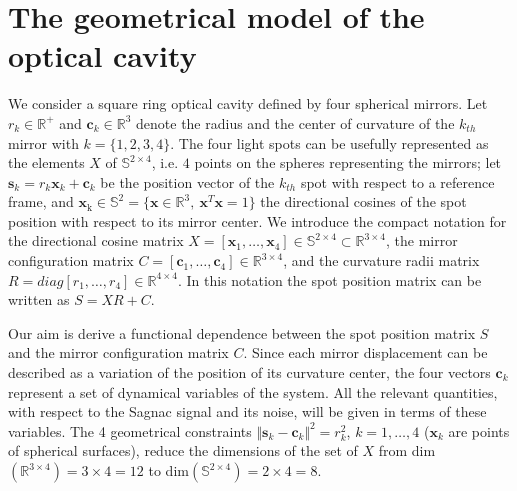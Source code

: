 \documentclass[12pt,a4paper,final]{iopart}
\begin{document}
\section{The geometrical model of the optical cavity}
We consider a square ring optical cavity defined by four spherical mirrors. 
Let $r_{k}\in\mathbb{R}^{+}$
and $\mathbf{c}_{k}\in\mathbb{R}^{3}$ denote the radius and the center
of curvature of the $k_{th}$ mirror with $k=\{ 1,2,3,4\} $.
The four light spots can be usefully represented as the elements $X$
of $\mathbb{S}^{2 \times 4}$, i.e. $4$ points on the spheres representing
the mirrors; let $\mathbf{s}_{k}=r{}_{k}\mathbf{x}_{k}+\mathbf{c}_{k}$
be the position vector of the $k_{th}$ spot with respect to a reference
frame, and $\mathbf{\mathbf{x}_{\mathrm{k}}}\in\mathbb{S}^{2}$$=\{ \mathbf{x}\in\mathbb{R}^{3},\ \mathbf{x}^{T}\mathbf{x}=1\} $
the directional cosines of the spot position with respect to its mirror
center. We introduce the compact notation for the directional cosine matrix
$X=[\mathbf{x}_{1},\ldots,\mathbf{x}_{4}]\in\mathbb{S}^{2 \times 4}\subset\mathbb{R}^{3\times4}$,
the mirror configuration matrix $C=[\mathbf{c}_{1},\ldots,\mathbf{c}_{4}]\in\mathbb{R}^{3\times4}$,
and the curvature radii matrix $R=diag[r_{1},\dots,r_{4}]\in\mathbb{R}^{4\times4}$.
In this notation the spot position matrix can be written as $S=XR+C$.

Our aim is derive a functional dependence between the spot position matrix $S$ and the mirror configuration matrix $C$. Since each mirror displacement 
can be described as a variation of the position of its curvature center,
the four vectors $\mathbf{c}_{k}$ represent a set of dynamical
variables of the system. All the relevant quantities, with respect to the Sagnac signal and its noise, will be given in terms of these variables.
The 4 geometrical constraints $\Vert \mathbf{s}_{k}-\mathbf{c}_{k}\Vert ^{2}=r{}_{k}^{2}$,
$k=1,\dots,4$ ($\mathbf{x}_{k}$  are points of spherical surfaces),
reduce the dimensions of the set of $X$  from dim$(\mathbb{R}^{3\times4})=3\times4=12$
to dim$(\mathbb{S}^{2\times4})=2\times4=8$.
\end{document}
